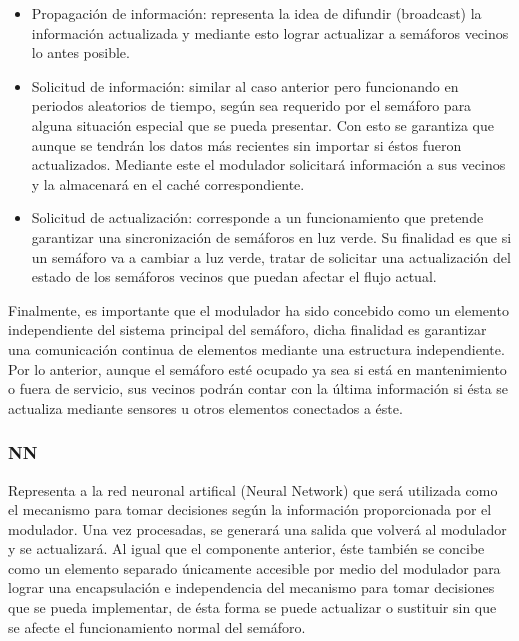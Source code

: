 \begin{itemize}
	\item	Propagaci\'{o}n de informaci\'{o}n: representa la idea de difundir (broadcast) la informaci\'{o}n actualizada y mediante esto lograr actualizar a sem\'{a}foros vecinos lo antes posible.

	\item 	Solicitud de informaci\'{o}n: similar al caso anterior pero funcionando en periodos aleatorios de tiempo, seg\'{u}n sea requerido por el sem\'{a}foro para alguna situaci\'{o}n especial que se pueda presentar. Con esto se garantiza que aunque se tendr\'{a}n los datos m\'{a}s recientes sin importar si \'{e}stos fueron actualizados. Mediante este el modulador solicitar\'{a} informaci\'{o}n a sus vecinos y la almacenar\'{a} en el cach\'{e} correspondiente.

	\item	Solicitud de actualizaci\'{o}n: corresponde a un funcionamiento que pretende garantizar una sincronizaci\'{o}n de sem\'{a}foros en luz verde. Su finalidad es que si un sem\'{a}foro va a cambiar a luz verde, tratar de solicitar una actualizaci\'{o}n del estado de los sem\'{a}foros vecinos que puedan afectar el flujo actual.
\end{itemize}


Finalmente, es importante que el modulador ha sido concebido como un elemento independiente del sistema principal del sem\'{a}foro, dicha finalidad es garantizar una comunicaci\'{o}n continua de elementos mediante una estructura independiente. Por lo anterior, aunque el sem\'{a}foro est\'{e} ocupado ya sea si est\'{a} en mantenimiento o fuera de servicio, sus vecinos podr\'{a}n contar con la \'{u}ltima informaci\'{o}n si \'{e}sta se actualiza mediante sensores u otros elementos conectados a \'{e}ste.


\subsubsection{NN}
Representa a la red neuronal artifical (Neural Network) que ser\'{a} utilizada como el mecanismo para tomar decisiones seg\'{u}n la informaci\'{o}n proporcionada por el modulador. Una vez procesadas, se generar\'{a} una salida que volver\'{a} al modulador y se actualizar\'{a}. Al igual que el componente anterior, \'{e}ste tambi\'{e}n se concibe como un elemento separado \'{u}nicamente accesible por medio del modulador para lograr una encapsulaci\'{o}n e independencia del mecanismo para tomar decisiones que se pueda implementar, de \'{e}sta forma se puede actualizar o sustituir sin que se afecte el funcionamiento normal del sem\'{a}foro.


